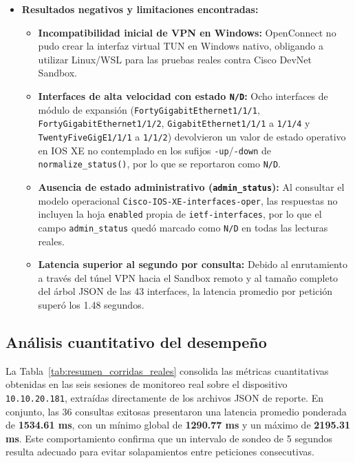 \documentclass[12pt,a4paper]{article}
\begin{document}
\begin{itemize}
\begin{itemize}
    \end{itemize}
    \item \textbf{Resultados negativos y limitaciones encontradas:}
    \begin{itemize}
        \item \textbf{Incompatibilidad inicial de VPN en Windows:} OpenConnect no pudo crear la interfaz virtual TUN en Windows nativo, obligando a utilizar Linux/WSL para las pruebas reales contra Cisco DevNet Sandbox.
        \item \textbf{Interfaces de alta velocidad con estado \texttt{N/D}:} Ocho interfaces de módulo de expansión (\texttt{FortyGigabitEthernet1/1/1}, \texttt{FortyGigabitEthernet1/1/2}, \texttt{GigabitEthernet1/1/1} a \texttt{1/1/4} y \texttt{TwentyFiveGigE1/1/1} a \texttt{1/1/2}) devolvieron un valor de estado operativo en IOS XE no contemplado en los sufijos \texttt{-up}/\texttt{-down} de \texttt{normalize\_status()}, por lo que se reportaron como \texttt{N/D}.
        \item \textbf{Ausencia de estado administrativo (\texttt{admin\_status}):} Al consultar el modelo operacional \texttt{Cisco-IOS-XE-interfaces-oper}, las respuestas no incluyen la hoja \texttt{enabled} propia de \texttt{ietf-interfaces}, por lo que el campo \texttt{admin\_status} quedó marcado como \texttt{N/D} en todas las lecturas reales.
        \item \textbf{Latencia superior al segundo por consulta:} Debido al enrutamiento a través del túnel VPN hacia el Sandbox remoto y al tamaño completo del árbol JSON de las 43 interfaces, la latencia promedio por petición superó los 1.48 segundos.
    \end{itemize}
\end{itemize}

\subsection{Análisis cuantitativo del desempeño}

La Tabla~\ref{tab:resumen_corridas_reales} consolida las métricas cuantitativas obtenidas en las seis sesiones de monitoreo real sobre el dispositivo \texttt{10.10.20.181}, extraídas directamente de los archivos JSON de reporte. En conjunto, las 36 consultas exitosas presentaron una latencia promedio ponderada de \textbf{1534.61 ms}, con un mínimo global de \textbf{1290.77 ms} y un máximo de \textbf{2195.31 ms}. Este comportamiento confirma que un intervalo de sondeo de 5 segundos resulta adecuado para evitar solapamientos entre peticiones consecutivas.
\end{document}
